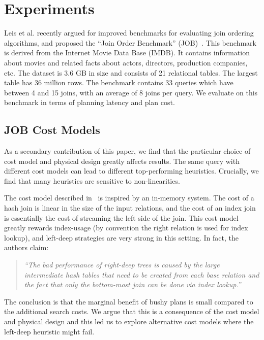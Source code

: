 \section{Experiments}
Leis et al. recently argued for improved benchmarks for evaluating join ordering algorithms, and proposed the ``Join Order Benchmark'' (JOB)~\cite{leis2015good}.
This benchmark is derived from the Internet Movie Data Base
(IMDB). It contains information
about movies and related facts about actors, directors,
production companies, etc. 
The dataset is 3.6 GB in size and consists of 21 relational tables.
The largest table has
36 million rows.
The benchmark contains 33 queries which have between 4 and 15 joins, with an average of 8 joins per query.  
We evaluate \sys on this benchmark in terms of planning latency and plan cost.


\subsection{JOB Cost Models}
As a secondary contribution of this paper, we find that the particular choice of cost model and physical design greatly affects results.
The same query with different cost models can lead to different top-performing heuristics.
Crucially, we find that many heuristics are sensitive to non-linearities.

The cost model described in~\cite{leis2015good} is inspired by an in-memory system. The cost of a hash join is linear in the size of the input relations, and the cost of an index join is essentially the cost of streaming the left side of the join.
This cost model greatly rewards index-usage (by convention the right relation is used for index lookup), and left-deep strategies are very strong in this setting. In fact, the authors claim: 
\begin{quote}
\emph{``The bad performance of right-deep trees is caused by the large intermediate hash tables that need to be created from each base relation and the fact that only the bottom-most join can
be done via index lookup.''}~\cite{leis2015good} 
\end{quote}
The conclusion is that the marginal benefit of bushy plans is small compared to the additional search costs.
We argue that this is a consequence of the cost model and physical design and this led us to explore alternative cost models where the left-deep heuristic might fail.


